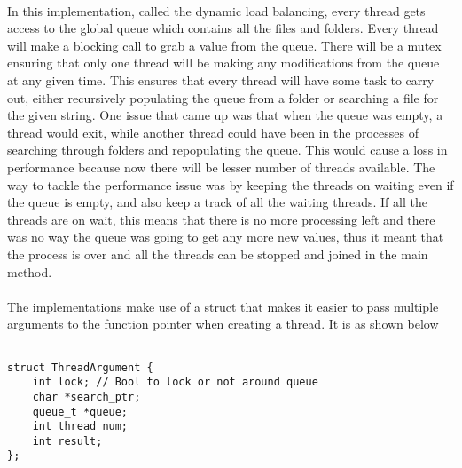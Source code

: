 \documentclass{article}
\begin{document}
\paragraph{}
In this implementation, called the dynamic load balancing, every thread gets access to the global queue which contains all the files and folders. Every thread will make a blocking call to grab a value from the queue. There will be a mutex ensuring that only one thread will be making any modifications from the queue at any given time. This ensures that every thread will have some task to carry out, either recursively populating the queue from a folder or searching a file for the given string. One issue that came up was that when the queue was empty, a thread would exit, while another thread could have been in the processes of searching through folders and repopulating the queue. This would cause a loss in performance because now there will be lesser number of threads available. The way to tackle the performance issue was by keeping the threads on waiting even if the queue is empty, and also keep a track of all the waiting threads. If all the threads are on wait, this means that there is no more processing left and there was no way the queue was going to get any more new values, thus it meant that the process is over and all the threads can be stopped and joined in the main method. 

\paragraph{}
The implementations make use of a struct that makes it easier to pass multiple arguments to the function pointer when creating a thread. It is as shown below

\begin{lstlisting}[frame=single]  % Start your code-block

struct ThreadArgument {
    int lock; // Bool to lock or not around queue
    char *search_ptr;
    queue_t *queue;
    int thread_num;
    int result;
};
\end{lstlisting}
\end{document}
